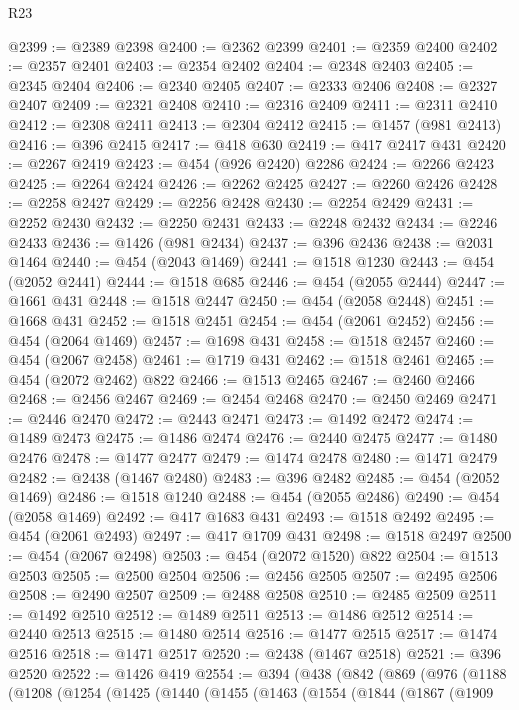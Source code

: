 \begin{lexlean}{R23}
\begin{coremodule}
{{{{{{{{{{{{{{{{{{{{{{{{{{{{{{{{{{{{{{{{{{{{{{{{{{{{{{{{{{{{{{{{{{{{{{{{{{{{{{{{{{{{{{{{{{{{{@2399 := @2389 @2398
@2400 := @2362 @2399
@2401 := @2359 @2400
@2402 := @2357 @2401
@2403 := @2354 @2402
@2404 := @2348 @2403
@2405 := @2345 @2404
@2406 := @2340 @2405
@2407 := @2333 @2406
@2408 := @2327 @2407
@2409 := @2321 @2408
@2410 := @2316 @2409
@2411 := @2311 @2410
@2412 := @2308 @2411
@2413 := @2304 @2412
@2415 := @1457 (@981 @2413)
@2416 := @396 @2415
@2417 := @418 @630
@2419 := @417 @2417 @431
@2420 := @2267 @2419
@2423 := @454 (@926 @2420) @2286
@2424 := @2266 @2423
@2425 := @2264 @2424
@2426 := @2262 @2425
@2427 := @2260 @2426
@2428 := @2258 @2427
@2429 := @2256 @2428
@2430 := @2254 @2429
@2431 := @2252 @2430
@2432 := @2250 @2431
@2433 := @2248 @2432
@2434 := @2246 @2433
@2436 := @1426 (@981 @2434)
@2437 := @396 @2436
@2438 := @2031 @1464
@2440 := @454 (@2043 @1469)
@2441 := @1518 @1230
@2443 := @454 (@2052 @2441)
@2444 := @1518 @685
@2446 := @454 (@2055 @2444)
@2447 := @1661 @431
@2448 := @1518 @2447
@2450 := @454 (@2058 @2448)
@2451 := @1668 @431
@2452 := @1518 @2451
@2454 := @454 (@2061 @2452)
@2456 := @454 (@2064 @1469)
@2457 := @1698 @431
@2458 := @1518 @2457
@2460 := @454 (@2067 @2458)
@2461 := @1719 @431
@2462 := @1518 @2461
@2465 := @454 (@2072 @2462) @822
@2466 := @1513 @2465
@2467 := @2460 @2466
@2468 := @2456 @2467
@2469 := @2454 @2468
@2470 := @2450 @2469
@2471 := @2446 @2470
@2472 := @2443 @2471
@2473 := @1492 @2472
@2474 := @1489 @2473
@2475 := @1486 @2474
@2476 := @2440 @2475
@2477 := @1480 @2476
@2478 := @1477 @2477
@2479 := @1474 @2478
@2480 := @1471 @2479
@2482 := @2438 (@1467 @2480)
@2483 := @396 @2482
@2485 := @454 (@2052 @1469)
@2486 := @1518 @1240
@2488 := @454 (@2055 @2486)
@2490 := @454 (@2058 @1469)
@2492 := @417 @1683 @431
@2493 := @1518 @2492
@2495 := @454 (@2061 @2493)
@2497 := @417 @1709 @431
@2498 := @1518 @2497
@2500 := @454 (@2067 @2498)
@2503 := @454 (@2072 @1520) @822
@2504 := @1513 @2503
@2505 := @2500 @2504
@2506 := @2456 @2505
@2507 := @2495 @2506
@2508 := @2490 @2507
@2509 := @2488 @2508
@2510 := @2485 @2509
@2511 := @1492 @2510
@2512 := @1489 @2511
@2513 := @1486 @2512
@2514 := @2440 @2513
@2515 := @1480 @2514
@2516 := @1477 @2515
@2517 := @1474 @2516
@2518 := @1471 @2517
@2520 := @2438 (@1467 @2518)
@2521 := @396 @2520
@2522 := @1426 @419
@2554 := @394
    (@438
      (@842
        (@869
          (@976
            (@1188
              (@1208
                (@1254
                  (@1425
                    (@1440
                      (@1455
                        (@1463
                          (@1554
                            (@1844
                              (@1867
                                (@1909
}}}}}}}}}}}}}}}}}}}}}}}}}}}}}}}}}}}}}}}}}}}}}}}}}}}}}}}}}}}}}}}}}}}}}}}}}}}}}}}}}}}}}}}}}}}}}
\end{coremodule}
\end{lexlean}
